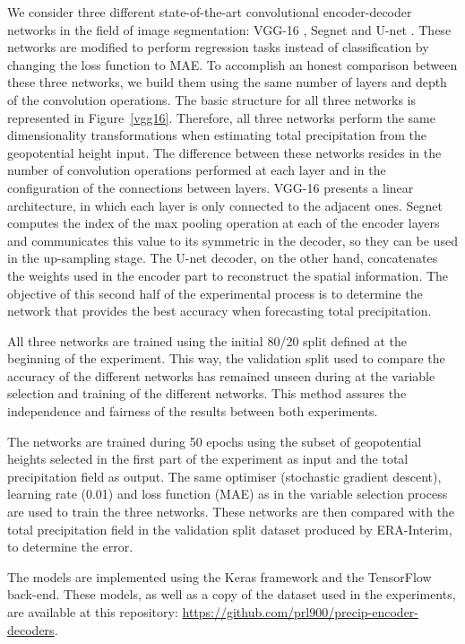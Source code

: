 \documentclass[twocol]{ametsoc}
\begin{document}
We consider three different state-of-the-art convolutional encoder-decoder networks in the field of image segmentation: VGG-16 \citep{long2015fully}, Segnet \citep{badrinarayanan2017segnet} and U-net \citep{ronneberger2015u}. These networks are modified to perform regression tasks instead of classification by changing the loss function to MAE. To accomplish an honest comparison between these three networks, we build them using the same number of layers and depth of the convolution operations. The basic structure for all three networks is represented in Figure~\ref{vgg16}. Therefore, all three networks perform the same dimensionality transformations when estimating total precipitation from the geopotential height input. The difference between these networks resides in the number of convolution operations performed at each layer and in the configuration of the connections between layers. VGG-16 presents a linear architecture, in which each layer is only connected to the adjacent ones. Segnet computes the index of the max pooling operation at each of the encoder layers and communicates this value to its symmetric in the decoder, so they can be used in the up-sampling stage. The U-net decoder, on the other hand, concatenates the weights used in the encoder part to reconstruct the spatial information. The objective of this second half of the experimental process is to determine the network that provides the best accuracy when forecasting total precipitation.

All three networks are trained using the initial 80/20 split defined at the beginning of the experiment. This way, the validation split used to compare the accuracy of the different networks has remained unseen during at the variable selection and training of the different networks. This method assures the independence and fairness of the results between both experiments. 

The networks are trained during 50 epochs using the subset of geopotential heights selected in the first part of the experiment as input and the total precipitation field as output. The same optimiser (stochastic gradient descent), learning rate (0.01) and loss function (MAE) as in the variable selection process are used to train the three networks. These networks are then compared with the total precipitation field in the validation split dataset produced by ERA-Interim, to determine the error.

The models are implemented using the Keras \citep{chollet2017keras} framework and the TensorFlow \citep{abadi2016tensorflow} back-end. These models, as well as a copy of the dataset used in the experiments, are available at this repository: \url{https://github.com/prl900/precip-encoder-decoders}.
\end{document}
